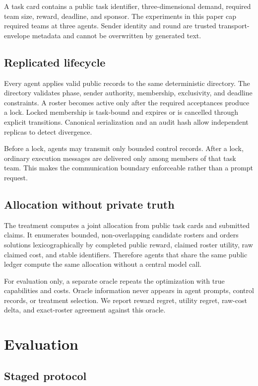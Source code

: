 \documentclass[letterpaper]{article} %
\begin{document}
A task card contains a public task identifier, three-dimensional demand,
required team size, reward, deadline, and sponsor.  The experiments in this
paper cap required teams at three agents.  Sender identity and round are
trusted transport-envelope metadata and cannot be overwritten by generated
text.

\subsection{Replicated lifecycle}

Every agent applies valid public records to the same deterministic directory.
The directory validates phase, sender authority, membership, exclusivity, and
deadline constraints.  A roster becomes active only after the required
acceptances produce a lock.  Locked membership is task-bound and expires or is
cancelled through explicit transitions.  Canonical serialization and an audit
hash allow independent replicas to detect divergence.

Before a lock, agents may transmit only bounded control records.  After a lock,
ordinary execution messages are delivered only among members of that task
team.  This makes the communication boundary enforceable rather than a prompt
request.

\subsection{Allocation without private truth}

The treatment computes a joint allocation from public task cards and submitted
claims.  It enumerates bounded, non-overlapping candidate rosters and orders
solutions lexicographically by completed public reward, claimed roster
utility, raw claimed cost, and stable identifiers.  Therefore agents that share
the same public ledger compute the same allocation without a central model
call.

For evaluation only, a separate oracle repeats the optimization with true
capabilities and costs.  Oracle information never appears in agent prompts,
control records, or treatment selection.  We report reward regret, utility
regret, raw-cost delta, and exact-roster agreement against this oracle.

\section{Evaluation}

\subsection{Staged protocol}
\end{document}
